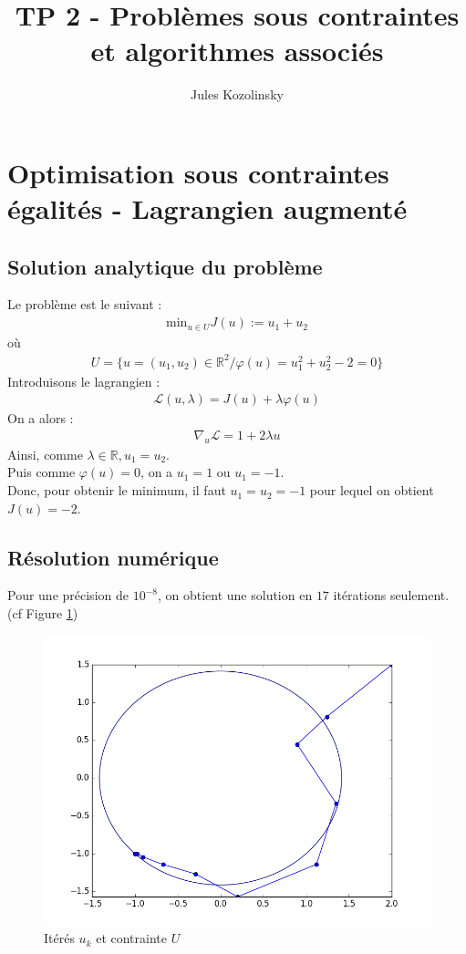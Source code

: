 \documentclass[paper=a4, fontsize=11pt]{article}
\title{\normalfont \normalsize 
\huge TP 2 - Problèmes sous contraintes et algorithmes associés}
\author{Jules Kozolinsky}
\date{}
\begin{document}
\maketitle
\section{Optimisation sous contraintes égalités - Lagrangien augmenté}
\subsection{Solution analytique du problème}
Le problème est le suivant : 
\begin{align*}
\text{min}_{u \in U} J(u) := u_1 + u_2 
\end{align*}
où 
\begin{align*}
U = \lbrace u = (u_1,u_2) \in \mathbb{R}^2 / \varphi(u) = u_1^2 + u_2^2 -2 = 0 \rbrace
\end{align*}
Introduisons le lagrangien :
\begin{align*}
\mathcal{L}(u,\lambda) = J(u) + \lambda\varphi(u)
\end{align*}
On a alors : 
\begin{align*}
\nabla_u \mathcal{L} = 1 + 2\lambda u 
\end{align*}
Ainsi, comme $\lambda \in \mathbb{R}, u_1 = u_2$.\\
Puis comme $\varphi(u) = 0$, on a $u_1 = 1$ ou $u_1 = -1$. \\
Donc, pour obtenir le minimum, il faut $u_1 = u_2 = -1$ pour lequel on obtient $J(u) = -2$.
\subsection{Résolution numérique}
Pour une précision de $10^{-8}$, on obtient une solution en $17$ itérations seulement. (cf Figure \ref{étiquette1})
\begin{figure}
 	\begin{center}
   \includegraphics[scale=0.6]{lagrangien-augmente}
   \end{center}
   \caption{\label{étiquette1} Itérés $u_k$ et contrainte $U$ }
\end{figure}
\end{document}
